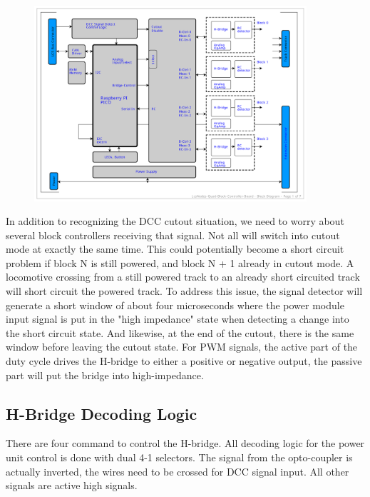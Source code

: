 \begin{figure}[htbp]
    \centering
    \includegraphics[page=6, width=0.9\textwidth]{./Schematics/Schematic_LcsNodes-Quad-Block-Controller.pdf}
\end{figure}
\FloatBarrier

In addition to recognizing the DCC cutout situation, we need to worry about several block controllers receiving that signal. Not all will switch into cutout mode at exactly the same time. This could potentially become a short circuit problem if block N is still powered, and block N + 1 already in cutout mode. A locomotive crossing from a still powered track to an already short circuited track will short circuit the powered track. To address this issue, the signal detector will generate a short window of about four microseconds where the power module input signal is put in the "high impedance" state when detecting a change into the short circuit state. And likewise, at the end of the cutout, there is the same window before leaving the cutout state. For PWM signals, the active part of the duty cycle drives the H-bridge to either a positive or negative output, the passive part will put the bridge into high-impedance.

\subsection{H-Bridge Decoding Logic}

There are four command to control the H-bridge. All decoding logic for the power unit control is done with dual 4-1 selectors. The signal from the opto-coupler is actually inverted, the wires need to be crossed for DCC signal input. All other signals are active high signals. 

